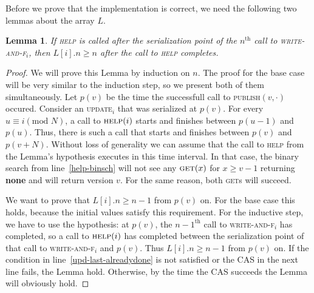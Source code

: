 \documentclass{thesis}
\def\none{\textbf{none} }
\newtheorem{lemma}{Lemma}
\newcommand{\fn}[1]{\textsc{#1}}
\begin{document}
Before we prove that the implementation is correct, we need the following two lemmas about the array $L$.

\begin{lemma}
	If \fn{help} is called after the serialization point of the $n^{\text{th}}$ call to \fn{write-and-f$_i$}, then $L[i].n \geq n$ after the call to \fn{help} completes. \label{last-is-complete}
\end{lemma}
\begin{proof}
	We will prove this Lemma by induction on $n$. The proof for the base case will be very similar to the induction step, so we present both of them simultaneously.
	Let $p(v)$ be the time the successfull call to \fn{publish}$(v, \cdot)$ occured. Consider an \fn{update$_i$} that was serialized at $p(v)$.
	For every $u \equiv i \left(\mbox{mod } N\right)$, a call to $\fn{help}(i)$ starts and finishes between $p(u-1)$ and $p(u)$. Thus, there is such a call that starts and finishes between $p(v)$ and $p(v+N)$.
	Without loss of generality we can assume that the call to \fn{help} from the Lemma's hypothesis executes in this time interval. In that case, the binary search from line~\ref{help-binsch} will not see any
	$\fn{get}(x)$ for $x \geq v-1$ returning \none and will	return version $v$. For the same reason, both \fn{get}s will succeed.

	We want to prove that $L[i].n \geq n-1$ from $p(v)$ on. For the base case this holds, because the initial values satisfy this requirement. For the inductive step, we have to use the hypothesis:
	at $p(v)$, the $n-1^{\text{th}}$ call to \fn{write-and-f$_i$} has completed, so a call to $\fn{help}(i)$ has completed between the serialization point of that call to \fn{write-and-f$_i$}
	and $p(v)$. Thus $L[i].n \geq n-1$ from $p(v)$ on. If the condition in line~\ref{upd-last-alreadydone} is not satisfied or the CAS in the next line fails, the Lemma hold.
	Otherwise, by the time the CAS succeeds the Lemma will obviously hold.
	
\end{proof}
\end{document}
